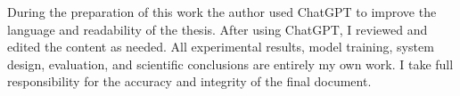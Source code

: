 During the preparation of this work the author used ChatGPT to improve the language and readability of the thesis. After using ChatGPT, I reviewed and edited the content as needed. All experimental results, model training, system design, evaluation, and scientific conclusions are entirely my own work. I take full responsibility for the accuracy and integrity of the final document.
